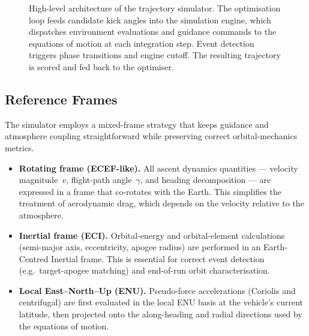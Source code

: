 \begin{figure}[htbp]
  \caption{High-level architecture of the trajectory simulator.  The
           optimisation loop feeds candidate kick angles into the simulation
           engine, which dispatches environment evaluations and guidance
           commands to the equations of motion at each integration step.  Event
           detection triggers phase transitions and engine cutoff.  The
           resulting trajectory is scored and fed back to the optimiser.}
  \label{fig:sim_architecture}
\end{figure}

\subsection{Reference Frames}
\label{ssec:reference_frames}

The simulator employs a mixed-frame strategy that keeps guidance and
atmosphere coupling straightforward while preserving correct orbital-mechanics
metrics.

\begin{itemize}
  \item \textbf{Rotating frame (ECEF-like).}  All ascent dynamics quantities
        --- velocity magnitude~$v$, flight-path angle~$\gamma$, and heading
        decomposition --- are expressed in a frame that co-rotates with the
        Earth.  This simplifies the treatment of aerodynamic drag, which
        depends on the velocity relative to the atmosphere.

  \item \textbf{Inertial frame (ECI).}  Orbital-energy and orbital-element
        calculations (semi-major axis, eccentricity, apogee radius) are
        performed in an Earth-Centred Inertial frame.  This is essential for
        correct event detection (e.g.\ target-apogee matching) and end-of-run
        orbit characterisation.

  \item \textbf{Local East--North--Up (ENU).}  Pseudo-force accelerations
        (Coriolis and centrifugal) are first evaluated in the local ENU basis at
        the vehicle's current latitude, then projected onto the along-heading
        and radial directions used by the equations of motion.
\end{itemize}

